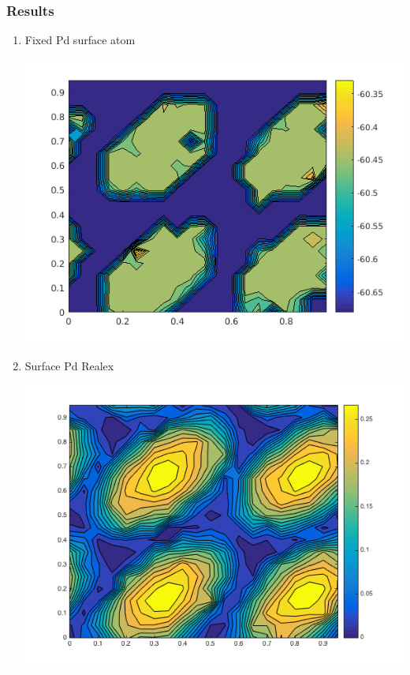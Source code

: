 \documentclass[11pt]{article}
\begin{document}
\subsubsection{Results}
\label{sec:org715e678}
\begin{enumerate}
\item Fixed Pd surface atom
\label{sec:org7251a43}
\begin{center}
\includegraphics[width=.9\linewidth]{./figures/map_fixPdsurface.png}
\end{center}
\item Surface Pd Realex
\label{sec:org81d797b}
\begin{center}
\includegraphics[width=.9\linewidth]{./figures/map_relaxedPdsurface.png}
\end{center}
\end{enumerate}
\end{document}
